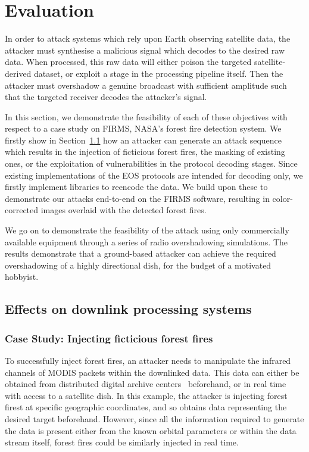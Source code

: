 \section{Evaluation}\label{sec:evaluation}

In order to attack systems which rely upon Earth observing satellite data, the attacker must synthesise a malicious signal which decodes to the desired raw data.
When processed, this raw data will either poison the targeted satellite-derived dataset, or exploit a stage in the processing pipeline itself.
Then the attacker must overshadow a genuine broadcast with sufficient amplitude such that the targeted receiver decodes the attacker's signal.

In this section, we demonstrate the feasibility of each of these objectives with respect to a case study on FIRMS, NASA's forest fire detection system.
We firstly show in Section~\ref{sec:effects-on-processing-systems} how an attacker can generate an attack sequence which results in the injection of ficticious forest fires, the masking of existing ones, or the exploitation of vulnerabilities in the protocol decoding stages.
Since existing implementations of the EOS protocols are intended for decoding only, we firstly implement libraries to reencode the data.
We build upon these to demonstrate our attacks end-to-end on the FIRMS software, resulting in color-corrected images overlaid with the detected forest fires.

We go on to demonstrate the feasibility of the attack using only commercially available equipment through a series of radio overshadowing simulations.
The results demonstrate that a ground-based attacker can achieve the required overshadowing of a highly directional dish, for the budget of a motivated hobbyist.

\subsection{Effects on downlink processing systems}\label{sec:effects-on-processing-systems}

\subsubsection{Case Study: Injecting ficticious forest fires}


To successfully inject forest fires, an attacker needs to manipulate the infrared channels of MODIS packets within the downlinked data.
This data can either be obtained from distributed digital archive centers~\cite{ladsweb} beforehand, or in real time with access to a satellite dish.
In this example, the attacker is injecting forest firest at specific geographic coordinates, and so obtains data representing the desired target beforehand.
However, since all the information required to generate the data is present either from the known orbital parameters or within the data stream itself, forest fires could be similarly injected in real time.

